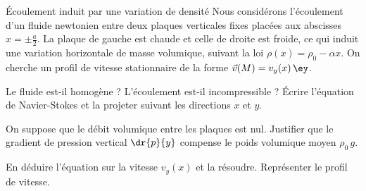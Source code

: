 \begin{exo}[PC][2][TD]{Écoulement induit par une variation de densité}
  Nous considérons l'écoulement d'un fluide newtonien entre deux plaques verticales fixes placées aux abscisses $x=\pm \textstyle\frac{a}{2}$. La plaque de gauche est chaude et celle de droite est froide, ce qui induit une variation horizontale de masse volumique, suivant la loi $\rho(x) = \rho_0-\alpha x$. On cherche un profil de vitesse stationnaire de la forme $\Vec{v}(M)=v_y(x)\,\ey$.
  \begin{quest}
    \item Le fluide est-il homogène ? L'écoulement est-il incompressible ? Écrire l'équation de Navier-Stokes et la projeter suivant les directions $x$ et $y$.
    \item On suppose que le débit volumique entre les plaques est nul. Justifier que le gradient de pression vertical $\textstyle\dr{p}{y}$ compense le poids volumique moyen $\rho_0 \,g$.
    \item En déduire l'équation sur la vitesse $v_y(x)$ et la résoudre. Représenter le profil de vitesse.
  \end{quest}
\end{exo}

